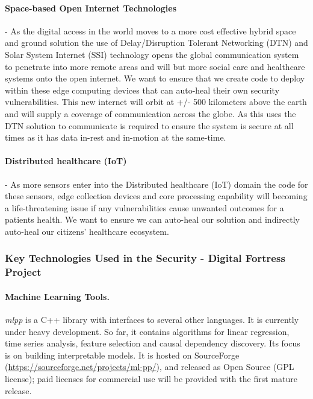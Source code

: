 \documentclass[a4paper,11pt]{article}
\newcommand{\project}[1]{\textbf{#1}\xspace}
\newcommand{\SECURITY}{\project{Security - Digital Fortress}}
\newcommand{\TheProject}{\SECURITY}
\begin{document}
\paragraph{Space-based Open Internet Technologies}
\label{sec:spacenet}
- As the digital access in the world moves to a more cost effective hybrid space and ground solution the use of Delay/Disruption Tolerant Networking (DTN) and Solar System Internet (SSI) technology opens the global communication system to penetrate into more remote areas and will but more social care and healthcare systems onto the open internet. We want to ensure that we create code to deploy within these edge computing devices that can auto-heal their own security vulnerabilities. This new internet will orbit at +/- 500 kilometers above the earth and will supply a coverage of communication across the globe. As this uses the DTN solution to communicate is required to ensure the system is secure at all times as it has data in-rest and in-motion at the same-time.

\paragraph{Distributed healthcare (IoT)}
\label{sec:health:IoT}
- As more sensors enter into the Distributed healthcare (IoT) domain the code for these sensors, edge collection devices and core processing capability will becoming a life-threatening issue if any vulnerabilities cause unwanted outcomes for a patients health. We want to ensure we can auto-heal our solution and indirectly auto-heal our citizens' healthcare ecosystem.

\subsubsection{Key Technologies Used in the \TheProject{} Project}
\label{sect:key-technologies}

\paragraph{\SCCHshort{} Machine Learning Tools.}
\label{sec:mlpp}
\emph{mlpp} is a C++ library with interfaces to several other languages. It 
is currently under heavy development. So far, it contains algorithms for 
linear regression, time series analysis, feature selection and causal 
dependency discovery. Its focus is on building interpretable models. It is hosted 
on SourceForge (\url{https://sourceforge.net/projects/ml-pp/}), and released 
as Open Source (GPL license); paid licenses for commercial use will be provided
with the first mature release.
\end{document}
